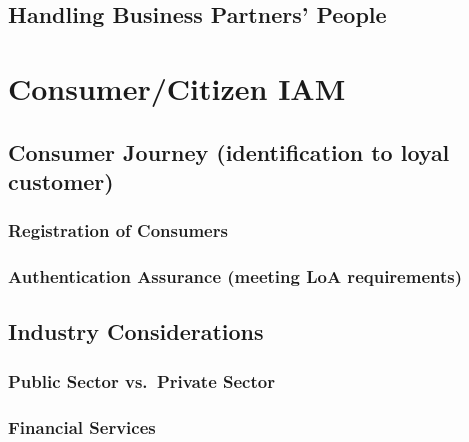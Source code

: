\hypertarget{handling-business-partners-people}{%
\section{Handling Business Partners'
People}\label{handling-business-partners-people}}

\hypertarget{consumercitizen-iam-1}{%
\chapter{Consumer/Citizen IAM}\label{consumercitizen-iam-1}}

\hypertarget{consumer-journey-identification-to-loyal-customer}{%
\section{Consumer Journey (identification to loyal
customer)}\label{consumer-journey-identification-to-loyal-customer}}

\hypertarget{registration-of-consumers}{%
\subsection{Registration of
Consumers}\label{registration-of-consumers}}

\hypertarget{authentication-assurance-meeting-loa-requirements}{%
\subsection{Authentication Assurance (meeting LoA
requirements)}\label{authentication-assurance-meeting-loa-requirements}}

\hypertarget{industry-considerations}{%
\section{Industry Considerations}\label{industry-considerations}}

\hypertarget{public-sector-vs.private-sector}{%
\subsection{Public Sector vs.~Private
Sector}\label{public-sector-vs.private-sector}}

\hypertarget{financial-services}{%
\subsection{Financial Services}\label{financial-services}}

